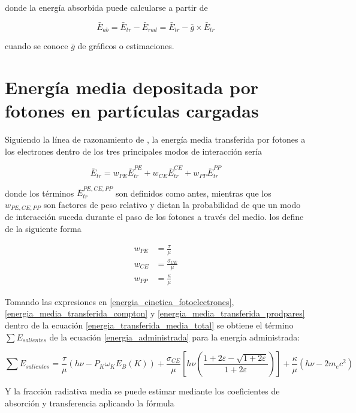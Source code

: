 \documentclass[12pt,letterpaper, oneside]{book}
\begin{document}
	
	\noindent donde la energía absorbida puede calcularse a partir de
	
	$$\bar{E}_{ab}=\bar{E}_{tr}-\bar{E}_{rad}=\bar{E}_{tr}-\bar{g}\times \bar{E}_{tr}$$
	
	\noindent cuando se conoce $\bar{g}$ de gráficos o estimaciones. 
	
	\section{Energía media depositada por fotones en partículas cargadas}
	Siguiendo la línea de razonamiento de \cite{Podgorsak.2016}, la energía media transferida por fotones a los electrones dentro de los tres principales modos de interacción sería
	
	\begin{equation}
		\bar{E}_{tr}=w_{PE}\bar{E}_{tr}^{PE}+w_{CE}\bar{E}_{tr}^{CE}+w_{PP}\bar{E}_{tr}^{PP} \label{energia_transferida_media_total}
	\end{equation}
	
	\noindent donde los términos $\bar{E}_{tr}^{PE, CE, PP}$ son definidos como antes, mientras que los $w_{PE, CE, PP}$ son factores de peso relativo y dictan la probabilidad de que un modo de interacción suceda durante el paso de los fotones a través del medio. \cite{Podgorsak.2016} los define de la siguiente forma
	
	\begin{align}
		w_{PE}&=\frac{\tau}{\mu}\\
		w_{CE}&=\frac{\sigma_{CE}}{\mu}\\
		w_{PP}&=\frac{\kappa}{\mu}
	\end{align} 
	
	Tomando las expresiones en \ref{energia_cinetica_fotoelectrones}, \ref{energia_media_transferida_compton} y \ref{energia_media_transferida_prodpares} dentro de la ecuación \ref{energia_transferida_media_total} se obtiene el término $\sum E_{salientes}$ de la ecuación \ref{energia_administrada} para la energía administrada:
	
	\begin{equation}
		\sum E_{salientes} = \frac{\tau}{\mu}\left(h\nu - P_K \omega_K E_B(K)\right) + \frac{\sigma_{CE}}{\mu}\left[h\nu \left(\frac{1+2\varepsilon - \sqrt{1+2\varepsilon}}{1+2\varepsilon}\right)\right] + \frac{\kappa}{\mu}\left(h\nu - 2m_ec^2\right)
	\end{equation}
	
	Y la fracción radiativa media se puede estimar mediante los coeficientes de absorción y transferencia\cite{Podgorsak.2016} aplicando la fórmula
	
\end{document}
